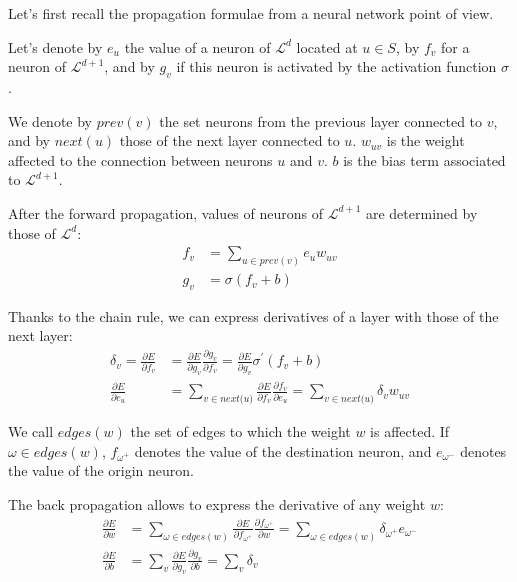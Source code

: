 Let's first recall the propagation formulae from a neural network point of view.

Let's denote by $e_u$ the value of a neuron of $\mathcal{L}^d$ located at $u \in S$, by $f_v$ for a neuron of $\mathcal{L}^{d+1}$, and by $g_v$ if this neuron is activated by the activation function $\sigma$.

We denote by $\textit{prev}(v)$ the set neurons from the previous layer connected to $v$, and by $\textit{next}(u)$ those of the next layer connected to $u$. $\textit{w}_{uv}$ is the weight affected to the connection between neurons $u$ and $v$. $b$ is the bias term associated to $\mathcal{L}^{d+1}$.

After the forward propagation, values of neurons of $\mathcal{L}^{d+1}$ are determined by those of $\mathcal{L}^d$:
\begin{align}
f_v &= \sum_{u \in \textit{prev}(v)}{e_u\textit{w}_{uv}} \\
g_v &= \sigma(f_v + b)
\end{align}

Thanks to the chain rule, we can express derivatives of a layer with those of the next layer:
\begin{align}
\delta_v = \frac{\partial{E}}{\partial{f_v}} &= \frac{\partial{E}}{\partial{g_v}}\frac{\partial{g_v}}{\partial{f_v}} = \frac{\partial{E}}{\partial{g_v}}\sigma^{'}(f_v + b) \\
\frac{\partial{E}}{\partial{e_u}} &= \sum_{v \in \textit{next(u)}}{\frac{\partial{E}}{\partial{f_v}}\frac{\partial{f_v}}{\partial{e_u}}} = \sum_{v \in \textit{next(u)}}{\delta_v\textit{w}_{uv}}
\end{align}

We call $\textit{edges}(\textit{w})$ the set of edges to which the weight $\textit{w}$ is affected. If $\omega \in \textit{edges}(\textit{w})$, $f_{\omega^+}$ denotes the value of the destination neuron, and $e_{\omega^-}$ denotes the value of the origin neuron.

The back propagation allows to express the derivative of any weight $\textit{w}$:
\begin{align}
\frac{\partial{E}}{\partial{\textit{w}}} &= \sum_{\omega \in \textit{edges}(\textit{w})}{\frac{\partial{E}}{\partial{f_{\omega^+}}}\frac{\partial{f_{\omega^+}}}{\partial{\textit{w}}}} = \sum_{\omega \in \textit{edges}(\textit{w})}{\delta_{\omega^+}e_{\omega^-}} \\
\frac{\partial{E}}{\partial{b}} &= \sum_{v}{\frac{\partial{E}}{\partial{g_v}}\frac{\partial{g_v}}{\partial{b}}} = \sum_{v}{\delta_v}
\end{align}

